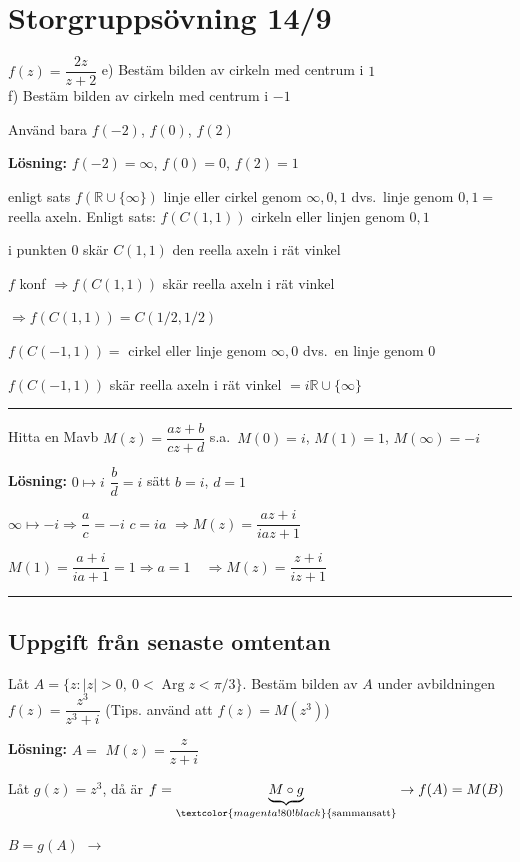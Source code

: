 \section{Storgruppsövning 14/9}

 \quad $f(z) = \dfrac{2z}{z + 2}$ \quad e) Bestäm bilden av cirkeln med centrum i $1$ \\
 \quad f) Bestäm bilden av cirkeln med centrum i $-1$

Använd bara $f(-2)$, $f(0)$, $f(2)$

\textbf{Lösning:}
$f(-2) = \infty$, $f(0) = 0$, $f(2) = 1$

enligt sats $f(\mathbb{R} \cup \{\infty\})$ linje eller cirkel genom $\infty, 0, 1$ dvs.\ linje genom $0, 1 =$ reella axeln. Enligt sats: $f(C(1, 1))$ cirkeln eller linjen genom $0, 1$

i punkten $0$ skär $C(1, 1)$ den reella axeln i rät vinkel

$f$ konf $\Rightarrow f(C(1, 1))$ skär reella axeln i rät vinkel

\qquad $\Rightarrow f(C(1, 1)) = C(1/2, 1/2)$

$f(C(-1, 1)) =$ cirkel eller linje genom $\infty, 0$ dvs.\ en linje genom $0$

$f(C(-1, 1))$ skär reella axeln i rät vinkel $= i\mathbb{R} \cup \{\infty\}$

\noindent\rule{\linewidth}{0.4pt}

 \quad Hitta en Mavb $M(z) = \dfrac{az + b}{cz + d}$ s.a.\ $M(0) = i$, $M(1) = 1$, $M(\infty) = -i$

\textbf{Lösning:} $0 \mapsto i$ \quad $\dfrac{b}{d} = i$ \quad sätt $b = i$, $d = 1$

\qquad $\infty \mapsto -i \Rightarrow \dfrac{a}{c} = -i$ \quad $c = ia$ \quad $\Rightarrow M(z) = \dfrac{az + i}{iaz + 1}$

$M(1) = \dfrac{a + i}{ia + 1} = 1 \Rightarrow a = 1 \quad \Longrightarrow M(z) = \dfrac{z + i}{iz + 1}$

\noindent\rule{\linewidth}{0.4pt}

\subsection{Uppgift från senaste omtentan}
Låt $A = \{z : |z| > 0,\ 0 < \operatorname{Arg} z < \pi/3\}$. Bestäm bilden av $A$ under avbildningen $f(z) = \dfrac{z^3}{z^3 + i}$ \quad (Tips. använd att $f(z) = M(z^3)$)

\textbf{Lösning:} \quad $A =$
\textcolor{blue!60!black}{$M(z) = \dfrac{z}{z + i}$}

Låt $g(z) = z^3$, då är $f = \underbrace{M \circ g}_{\textcolor{magenta!80!black}{\text{sammansatt}}} \to f(A) = M(B)$

$B = g(A)$
\hfill $\longrightarrow$
